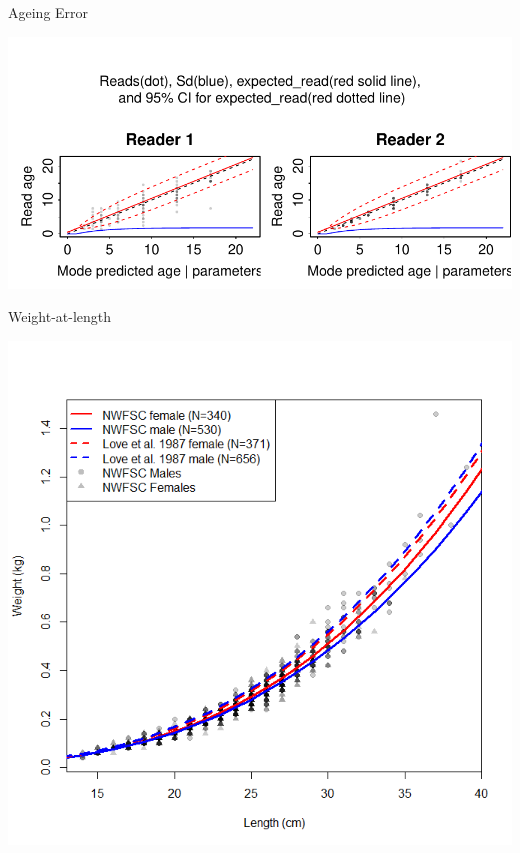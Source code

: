 \documentclass[ignorenonframetext,]{beamer}
\begin{document}
\begin{frame}{Ageing Error}

\includegraphics{Figures/Fleet8_NWFSCTrawl_ageerror2.pdf}

\end{frame}

\begin{frame}{Weight-at-length}

\centering
 \includegraphics{Figures/Length_weight.png}

\end{frame}
\end{document}
